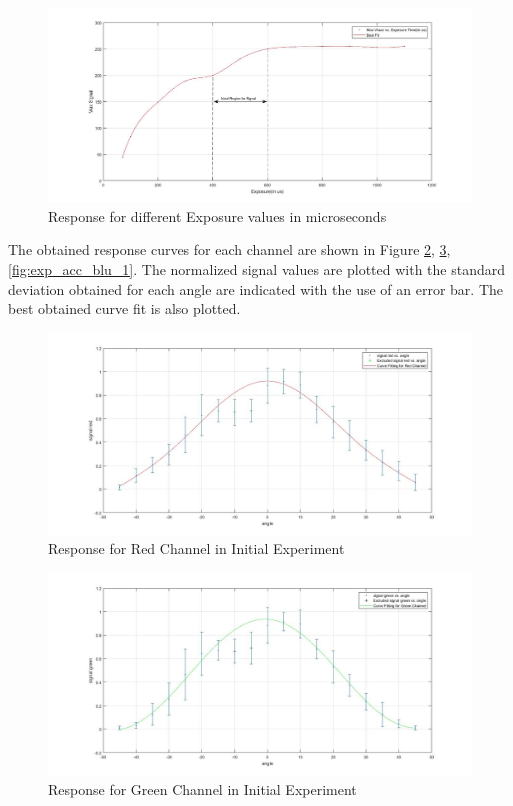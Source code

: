 \begin{figure}[ht]
\centering
\includegraphics[scale=0.25]{pics/ExposureTests.jpg}
\caption{Response for different Exposure values in microseconds}
\label{fig:exp_acc_exp}
\end{figure}

The obtained response curves for each channel are shown in Figure \ref{fig:exp_acc_red_1}, \ref{fig:exp_acc_green_1}, \ref{fig:exp_acc_blu_1}. The normalized signal values are plotted with the standard deviation obtained for each angle are indicated with the use of an error bar. The best obtained curve fit is also plotted.
 \begin{figure}[ht]
\centering
\includegraphics[scale=0.25]{pics/RedChannel.jpg}
\caption{Response for Red Channel in Initial Experiment}
\label{fig:exp_acc_red_1}
\end{figure}

 \begin{figure}[ht]
\centering
\includegraphics[scale=0.25]{pics/GreenChannel.jpg}
\caption{Response for Green Channel in Initial Experiment}
\label{fig:exp_acc_green_1}
\end{figure}

